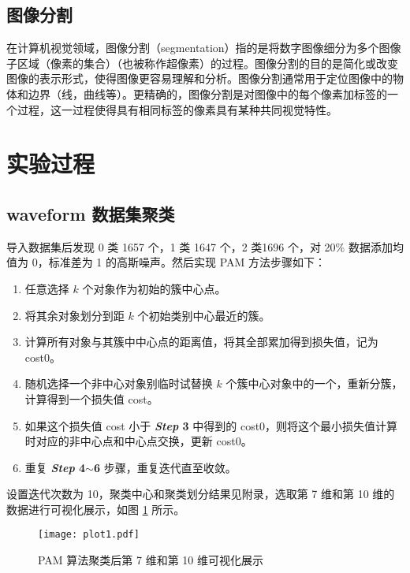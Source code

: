 \documentclass[12pt,AutoFakeBold]{article}
\begin{document}
\subsection{图像分割}

在计算机视觉领域，图像分割（segmentation）指的是将数字图像细分为多个图像子区域（像素的集合）（也被称作超像素）的过程。图像分割的目的是简化或改变图像的表示形式，使得图像更容易理解和分析。图像分割通常用于定位图像中的物体和边界（线，曲线等）。更精确的，图像分割是对图像中的每个像素加标签的一个过程，这一过程使得具有相同标签的像素具有某种共同视觉特性。

\section{实验过程}

\subsection{waveform 数据集聚类}

导入数据集后发现 0 类 1657 个，1 类 1647 个，2 类1696 个，对 20\% 数据添加均值为 0，标准差为 1 的高斯噪声。然后实现 PAM 方法步骤如下：

\begin{enumerate}
\renewcommand{\labelenumi}{\bfseries \textit{Step} \theenumi.}

\item 任意选择 $k$ 个对象作为初始的簇中心点。

\item 将其余对象划分到距 $k$ 个初始类别中心最近的簇。

\item 计算所有对象与其簇中中心点的距离值，将其全部累加得到损失值，记为 cost0。

\item 随机选择一个非中心对象别临时试替换 $k$ 个簇中心对象中的一个，重新分簇，计算得到一个损失值 cost。

\item 如果这个损失值 cost 小于 \textbf{\textit{Step} 3} 中得到的 cost0，则将这个最小损失值计算时对应的非中心点和中心点交换，更新 cost0。

\item 重复 \textbf{\textit{Step} 4$\sim$6} 步骤，重复迭代直至收敛。
\end{enumerate}

设置迭代次数为 10，聚类中心和聚类划分结果见附录，选取第 7 维和第 10 维的数据进行可视化展示，如图 \ref{fig:plot1} 所示。

\begin{figure}[htbp]
	\centering
    \texttt{[image: plot1.pdf]}
    \caption{PAM 算法聚类后第 7 维和第 10 维可视化展示} \label{fig:plot1}
\end{figure}
\end{document}
